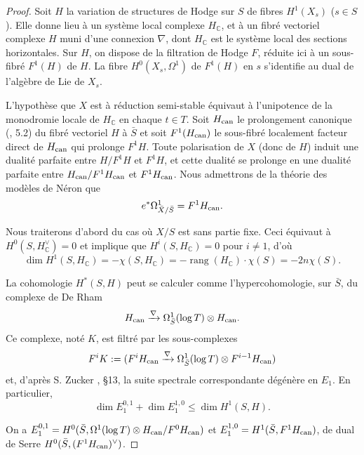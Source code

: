 \documentclass[12pt,a4paper]{article}
\theoremstyle{plain}
\theoremstyle{definition}
\DeclareMathOperator{\rank}{rang}
\newcommand{\can}{\textup{can}}
\newcommand{\CC}{\mathbb{C}}
\begin{document}
\begin{proof}
Soit $H$ la variation de structures de Hodge sur $S$ de fibres $H^{1}(X_{s})$ ($s \in S$). Elle donne lieu \`{a} un syst\`{e}me local complexe $H_{\CC}$, et \`{a} un fibr\'{e} vectoriel complexe $H$ muni d'une connexion $\nabla$, dont $H_{\CC}$ est le syst\`{e}me local des sections horizontales. Sur $H$, on dispose de la filtration de Hodge $F$, r\'{e}duite ici \`{a} un sous-fibr\'{e} $F^{1}(H)$ de $H$. La fibre $H^{0}(X_{s}, \Omega^{1})$ de $F^{1}(H)$ en $s$ s'identifie au dual de l'alg\`{e}bre de Lie de $X_{s}$.

L'hypoth\`{e}se que $X$ est \`{a} r\'{e}duction semi-stable \'{e}quivaut \`{a} l'unipotence de la monodromie locale de $H_{\CC}$ en chaque $t \in T$. Soit $H_{\can}$ le prolongement canonique (\cite{DeligneEDR}, 5.2) du fibr\'{e} vectoriel $H$ \`{a} $\bar{S}$ et soit $F^{1}(H_{\can})$ le sous-fibr\'{e} localement facteur direct de $H_{\can}$ qui prolonge $F^{1}H$. Toute polarisation de $X$ (donc de $H$) induit une dualit\'{e} parfaite entre $H/F^{1}H$ et $F^{1}H$, et cette dualit\'{e} se prolonge en une dualit\'{e} parfaite entre $H_{\can}/F^{1}H_{\can}$ et $F^{1}H_{\can}$. Nous admettrons de la th\'{e}orie des mod\`{e}les de N\'{e}ron que
\[
e^{*}\Omega^{1}_{\bar{X}/\bar{S}} = F^{1}H_{\can}.
\]

Nous traiterons d'abord du cas o\`{u} $X/S$ est sans partie fixe. Ceci \'{e}quivaut \`{a} $H^{0}(S, H_{\CC}^{\vee}) = 0$ et implique que $H^{i}(S, H_{\CC}) = 0$ pour $i \neq 1$, d'o\`{u}
\begin{equation}\label{eq:3.2.1}
\dim H^{1}(S, H_{\CC}) = -\chi(S, H_{\CC}) = -\rank(H_{\CC}) \cdot \chi(S) = -2n\chi(S).
\end{equation}

La cohomologie $H^{*}(S, H)$ peut se calculer comme l'hypercohomologie, sur $\bar{S}$, du complexe de De Rham
\[
H_{\can} \xrightarrow{\nabla} \Omega^{1}_{\bar{S}}(\log T) \otimes H_{\can}.
\]
Ce complexe, not\'{e} $K$, est filtr\'{e} par les sous-complexes
\[
F^{i}K := (F^{i}H_{\can} \xrightarrow{\nabla} \Omega^{1}_{\bar{S}}(\log T) \otimes F^{i-1}H_{\can})
\]
et, d'apr\`{e}s S. Zucker \cite{Zucker}, \S13, la suite spectrale correspondante d\'{e}g\'{e}n\`{e}re en $E_{1}$. En particulier,
\begin{equation}\label{eq:3.2.2}
\dim E_{1}^{0,1} + \dim E_{1}^{1,0} \leq \dim H^{1}(S, H).
\end{equation}

On a $E_{1}^{0,1} = H^{0}(\bar{S}, \Omega^{1}(\log T) \otimes H_{\can}/F^{0}H_{\can})$ et $E_{1}^{1,0} = H^{1}(\bar{S}, F^{1}H_{\can})$, de dual de Serre $H^{0}(\bar{S}, (F^{1}H_{\can})^{\vee})$.


\end{proof}
\end{document}
